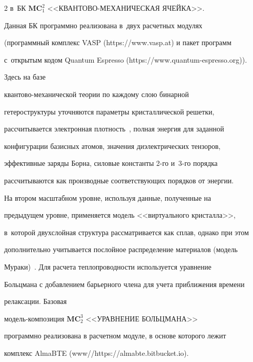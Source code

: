 \begin{multicols}{2}
в~БК $\mathbf{MC}_1^2$ <<КВАН\-ТО\-ВО-МЕ\-ХА\-НИ\-ЧЕ\-СКАЯ ЯЧЕЙКА>>. 


Данная БК программно реализована в~двух расчетных модулях 


(программный комплекс VASP ({\sf https://www.\linebreak vasp.at}) и пакет программ 


с~открытым кодом Quantum Espresso ({\sf https://www.quantum-espresso.org})). 


Здесь на базе  


кван\-то\-во-ме\-ха\-ни\-че\-ской теории по каждому слою бинарной 


гетероструктуры уточняются параметры кристаллической решетки, 


рассчитывается электронная плот\-ность~\cite{7-ab}, полная энергия для заданной 


конфигурации базисных атомов, значения диэлектрических тензоров, 


эффективные заряды Борна, силовые константы 2-го и~3-го порядка 


рассчитываются как производные со\-от\-вет\-ст\-ву\-ющих порядков от энергии.


        


    На втором масштабном уровне, используя данные, полученные на 


предыдущем уровне, применяется модель <<виртуального кристалла>>, 


в~которой двухслойная структура рассматривается как сплав, однако при этом 


дополнительно учитывается послойное распределение материалов (модель 


Мураки)~\cite{17-ab}. Для расчета теплопроводности используется уравнение 


Больцмана с добавлением барьерного члена для учета приближения времени 


релаксации. Базовая  


мо\-дель-ком\-по\-зи\-ция $\mathbf{MC}_2^3$ <<УРАВНЕНИЕ БОЛЬЦМАНА>> 


программно реализована в расчетном модуле, в основе которого лежит 


комплекс AlmaBTE ({\sf www//https://almabte.bitbucket.io}).





     \begin{figure} %


     \vspace*{1pt}



\end{figure}
\end{multicols}

